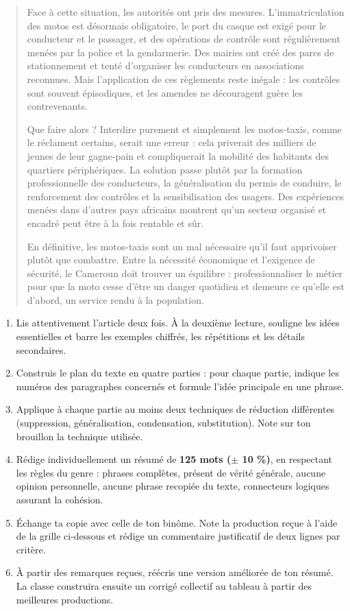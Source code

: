 \documentclass[11pt]{article}
\newcommand{\cle}[1]{{\popxbold\color{popdark}#1}}
\newcounter{popsec}
\newcounter{popsub}
\newcommand{\courssub}[1]{%
  \stepcounter{popsub}%
  \par\vspace{9pt}\noindent{\popxbold\fontsize{11.5}{13}\selectfont\color{popink}{\color{poporange}\thepopsec.\thepopsub}\hspace{6pt}#1}\par\nopagebreak\vspace{4pt}
}
\begin{document}
\begin{quote}
Face à cette situation, les autorités ont pris des mesures. L'immatriculation des motos est désormais obligatoire, le port du casque est exigé pour le conducteur et le passager, et des opérations de contrôle sont régulièrement menées par la police et la gendarmerie. Des mairies ont créé des parcs de stationnement et tenté d'organiser les conducteurs en associations reconnues. Mais l'application de ces règlements reste inégale : les contrôles sont souvent épisodiques, et les amendes ne découragent guère les contrevenants.

Que faire alors ? Interdire purement et simplement les motos-taxis, comme le réclament certains, serait une erreur : cela priverait des milliers de jeunes de leur gagne-pain et compliquerait la mobilité des habitants des quartiers périphériques. La solution passe plutôt par la formation professionnelle des conducteurs, la généralisation du permis de conduire, le renforcement des contrôles et la sensibilisation des usagers. Des expériences menées dans d'autres pays africains montrent qu'un secteur organisé et encadré peut être à la fois rentable et sûr.

En définitive, les motos-taxis sont un mal nécessaire qu'il faut apprivoiser plutôt que combattre. Entre la nécessité économique et l'exigence de sécurité, le Cameroun doit trouver un équilibre : professionnaliser le métier pour que la moto cesse d'être un danger quotidien et demeure ce qu'elle est d'abord, un service rendu à la population.
\end{quote}

\courssub{Consignes}

\begin{enumerate}
\item Lis attentivement l'article deux fois. À la deuxième lecture, souligne les \cle{idées essentielles} et barre les exemples chiffrés, les répétitions et les détails secondaires.
\item Construis le \cle{plan du texte} en quatre parties : pour chaque partie, indique les numéros des paragraphes concernés et formule l'idée principale en une phrase.
\item Applique à chaque partie au moins deux \cle{techniques de réduction} différentes (suppression, généralisation, condensation, substitution). Note sur ton brouillon la technique utilisée.
\item Rédige individuellement un résumé de \textbf{125 mots ($\pm$ 10 \%)}, en respectant les règles du genre : phrases complètes, présent de vérité générale, aucune opinion personnelle, aucune phrase recopiée du texte, connecteurs logiques assurant la \cle{cohésion}.
\item Échange ta copie avec celle de ton binôme. Note la production reçue à l'aide de la grille ci-dessous et rédige un commentaire justificatif de deux lignes par critère.
\item À partir des remarques reçues, réécris une \cle{version améliorée} de ton résumé. La classe construira ensuite un corrigé collectif au tableau à partir des meilleures productions.
\end{enumerate}
\end{document}
